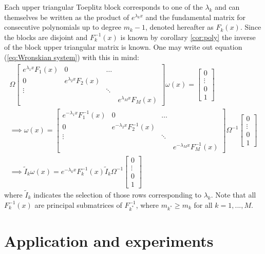 \documentclass{article}
\begin{document}
Each upper triangular Toeplitz block corresponds to one of the $\lambda_k$ and can themselves be written as the product of $e^{\lambda_k x}$ and the fundamental matrix for consecutive polynomials up to degree $m_k-1$, denoted hereafter as $F_k(x)$.
Since the blocks are disjoint and $F_k^{-1}(x)$ is known by corollary \ref{cor:poly} the inverse of the block upper triangular matrix is known.
One may write out equation (\ref{eq:Wronskian system}) with this in mind:
\begin{align*}
\Omega \begin{bmatrix} e^{\lambda_1 x} F_1(x) & 0 & \dots & \\
0 & e^{\lambda_2 x} F_2(x) & & \\
\vdots & & \ddots & \\
 & & & e^{\lambda_M x} F_M(x) \end{bmatrix} \omega(x) = \begin{bmatrix} 0 \\ \vdots \\ 0 \\ 1 \end{bmatrix} \\
 \implies  \omega(x) = \begin{bmatrix} e^{-\lambda_1 x} F_1^{-1}(x) & 0 & \dots & \\
0 & e^{-\lambda_2 x} F_2^{-1}(x) & & \\
\vdots & & \ddots & \\
 & & & e^{-\lambda_M x} F_M^{-1}(x) \end{bmatrix} \Omega^{-1} \begin{bmatrix} 0 \\ \vdots \\ 0 \\ 1 \end{bmatrix} \\
 \implies \tilde{I}_k \omega(x) = e^{-\lambda_k x} F_k^{-1}(x) \tilde{I}_k \Omega^{-1} \begin{bmatrix} 0 \\ \vdots \\ 0 \\ 1 \end{bmatrix}
\end{align*}
where $\tilde{I}_k $ indicates the selection of those rows corresponding to $\lambda_k$.
Note that all $F_k^{-1}(x)$ are principal submatrices of $F_{k^*}^{-1}$, where $m_{k^*} \geq m_k$ for all $k=1,...,M$.

\section{Application and experiments}
\end{document}
